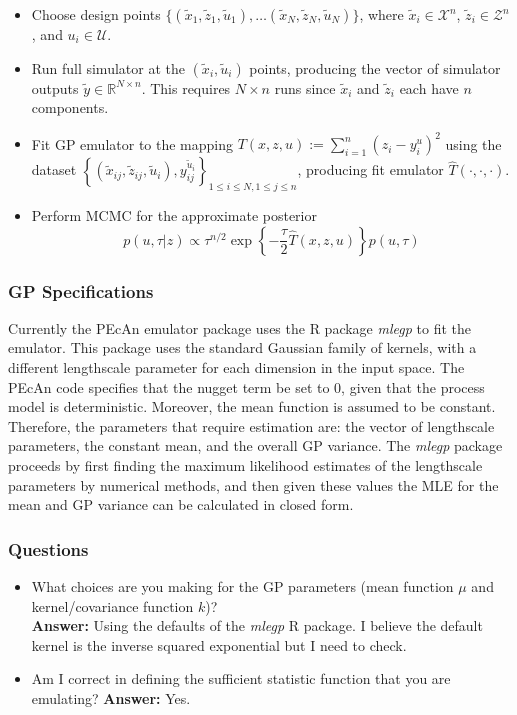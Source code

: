 \documentclass[12pt]{article}
\newcommand{\R}{\mathcal{R}}
\def\R{\mathbb{R}}
\begin{document}
\begin{itemize}
\item Choose design points $\{(\tilde{x}_1, \tilde{z}_1, \tilde{u}_1), \dots (\tilde{x}_N, \tilde{z}_N, \tilde{u}_N)\}$, where $\tilde{x}_i \in \mathcal{X}^n$, $\tilde{z}_i \in \mathcal{Z}^n$, and $u_i \in \mathcal{U}$. 
\item Run full simulator at the $(\tilde{x}_i, \tilde{u}_i)$ points, producing the vector of simulator outputs $\tilde{y} \in \R^{N \times n}$. This requires $N \times n$ runs since $\tilde{x}_i$ and $\tilde{z}_i$
each have $n$ components. 
\item Fit GP emulator to the mapping $T(x, z, u) := \sum_{i = 1}^n (z_i - y_i^{u})^2$ using the dataset $\left\{(\tilde{x}_{ij}, \tilde{z}_{ij}, \tilde{u}_i), y_{ij}^{\tilde{u}_i}\right\}_{1 \leq i \leq N, 1 \leq j \leq n}$, producing fit emulator $\hat{T}(\cdot, \cdot, \cdot)$. 
\item Perform MCMC for the approximate posterior
\[p(u, \tau|z) \propto \tau^{n/2} \exp\left\{-\frac{\tau}{2} \hat{T}(x, z, u) \right\}p(u, \tau)\]
\end{itemize}

\subsubsection{GP Specifications}
Currently the PEcAn emulator package uses the R package \textit{mlegp} to fit the emulator. This package uses the standard Gaussian family of kernels, with a different lengthscale parameter for 
each dimension in the input space. The PEcAn code specifies that the nugget term be set to 0, given that the process model is deterministic. Moreover, the mean function is assumed to be constant. 
Therefore, the parameters that require estimation are: the vector of lengthscale parameters, the constant mean, and the overall GP variance. The \textit{mlegp} package proceeds by first finding
the maximum likelihood estimates of the lengthscale parameters by numerical methods, and then given these values the MLE for the mean and GP variance can be calculated in closed form. 


\subsubsection{Questions}
\begin{itemize}
\item What choices are you making for the GP parameters (mean function $\mu$ and kernel/covariance function $k$)? \\
\textbf{Answer: } Using the defaults of the \textit{mlegp} R package. I believe the default kernel is the inverse squared exponential but I need to check. 
\item Am I correct in defining the sufficient statistic function that you are emulating? 
\textbf{Answer: } Yes. 
\end{itemize}
\end{document}
